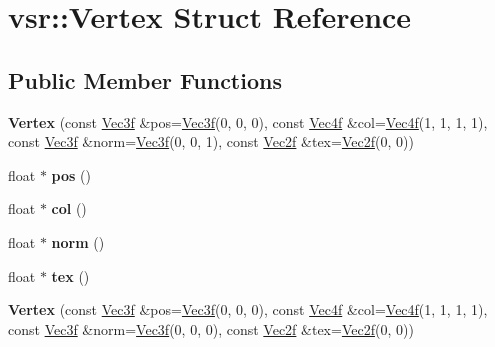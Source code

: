 \hypertarget{structvsr_1_1_vertex}{\section{vsr\-:\-:Vertex Struct Reference}
\label{structvsr_1_1_vertex}
}
\subsection*{Public Member Functions}
\begin{DoxyCompactItemize}
\item 
\hypertarget{structvsr_1_1_vertex_a2560a917c95676d99242e31a7c0a2080}{{\bfseries Vertex} (const \hyperlink{classvsr_1_1_vec3}{Vec3f} \&pos=\hyperlink{classvsr_1_1_vec3}{Vec3f}(0, 0, 0), const \hyperlink{classvsr_1_1_vec4}{Vec4f} \&col=\hyperlink{classvsr_1_1_vec4}{Vec4f}(1, 1, 1, 1), const \hyperlink{classvsr_1_1_vec3}{Vec3f} \&norm=\hyperlink{classvsr_1_1_vec3}{Vec3f}(0, 0, 1), const \hyperlink{classvsr_1_1_vec2}{Vec2f} \&tex=\hyperlink{classvsr_1_1_vec2}{Vec2f}(0, 0))}\label{structvsr_1_1_vertex_a2560a917c95676d99242e31a7c0a2080}

\item 
\hypertarget{structvsr_1_1_vertex_ac0d4391c2402d2ea6d64449ab8c1d219}{float $\ast$ {\bfseries pos} ()}\label{structvsr_1_1_vertex_ac0d4391c2402d2ea6d64449ab8c1d219}

\item 
\hypertarget{structvsr_1_1_vertex_a6fb1bfd518ef19d6419eebf743e2385c}{float $\ast$ {\bfseries col} ()}\label{structvsr_1_1_vertex_a6fb1bfd518ef19d6419eebf743e2385c}

\item 
\hypertarget{structvsr_1_1_vertex_a2b0a322a6494a72f5fc6447e22ef1452}{float $\ast$ {\bfseries norm} ()}\label{structvsr_1_1_vertex_a2b0a322a6494a72f5fc6447e22ef1452}

\item 
\hypertarget{structvsr_1_1_vertex_a0979b843cf1af964507d759c78ac1168}{float $\ast$ {\bfseries tex} ()}\label{structvsr_1_1_vertex_a0979b843cf1af964507d759c78ac1168}

\item 
\hypertarget{structvsr_1_1_vertex_ad75f77d82511a5dec5fccdcf4d2d3221}{{\bfseries Vertex} (const \hyperlink{classvsr_1_1_vec3}{Vec3f} \&pos=\hyperlink{classvsr_1_1_vec3}{Vec3f}(0, 0, 0), const \hyperlink{classvsr_1_1_vec4}{Vec4f} \&col=\hyperlink{classvsr_1_1_vec4}{Vec4f}(1, 1, 1, 1), const \hyperlink{classvsr_1_1_vec3}{Vec3f} \&norm=\hyperlink{classvsr_1_1_vec3}{Vec3f}(0, 0, 0), const \hyperlink{classvsr_1_1_vec2}{Vec2f} \&tex=\hyperlink{classvsr_1_1_vec2}{Vec2f}(0, 0))}\label{structvsr_1_1_vertex_ad75f77d82511a5dec5fccdcf4d2d3221}

\end{DoxyCompactItemize}
